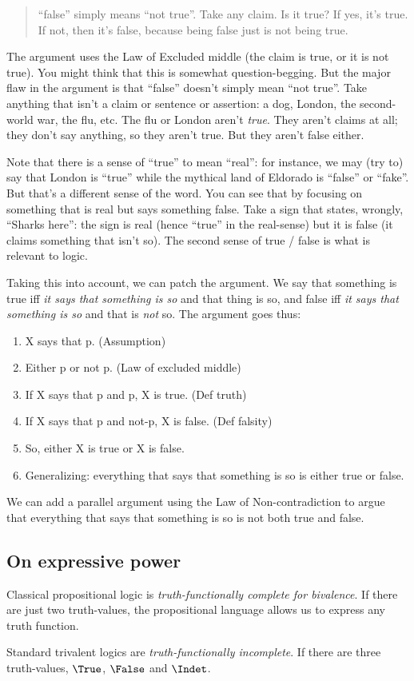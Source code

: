 \documentclass[../../../include/open-logic-section]{subfiles}
\begin{document}
\begin{quote} ``false'' simply means ``not true''. Take any claim. Is it true? If yes, it's true. If not, then it's false, because being false just is not being true.	
\end{quote} 

The argument uses the Law of Excluded middle (the claim is true, or it is not true). You might think that this is somewhat question-begging. But the major flaw in the argument is that ``false'' doesn't simply mean ``not true''. Take anything that isn't a claim or sentence or assertion: a dog, London, the second-world war, the flu, etc. The flu or London aren't \emph{true}. They aren't claims at all; they don't say anything, so they aren't true. But they aren't false either. 

Note that there is a sense of ``true'' to mean ``real'': for instance, we may (try to) say that London is ``true'' while the mythical land of Eldorado is ``false'' or ``fake''. But that's a different sense of the word. You can see that by focusing on something that is real but says something false. Take a sign that states, wrongly, ``Sharks here'': the sign is real (hence ``true'' in the real-sense) but it is false (it claims something that isn't so). The second sense of true / false is what is relevant to logic.

Taking this into account, we can patch the argument. We say that something is true iff \emph{it says that something is so} and that thing is so, and false iff \emph{it says that something is so} and that is \emph{not} so. The argument goes thus:

\begin{enumerate}
	\item X says that p. (Assumption)
	\item Either p or not p. (Law of excluded middle)
	\item If X says that p and p, X is true. (Def truth)
	\item If X says that p and not-p, X is false. (Def falsity)
	\item So, either X is true or X is false.
	\item Generalizing: everything that says that something is so is either true or false.
\end{enumerate}

We can add a parallel argument using the Law of Non-contradiction to argue that everything that says that something is so is not both true and false.

\subsection{On expressive power}

Classical propositional logic is \emph{truth-functionally complete for bivalence}. If there are just two truth-values, the propositional language allows us to express any truth function. 

Standard trivalent logics are \emph{truth-functionally incomplete}. If there are three truth-values, $\True$, $\False$ and $\Indet$.  
\end{document}
